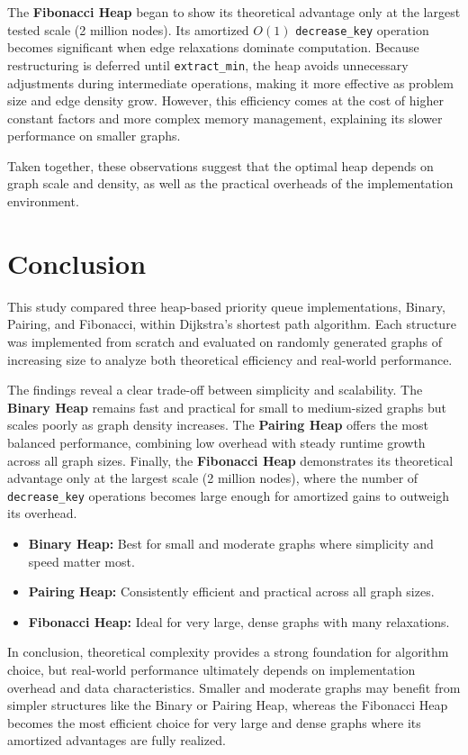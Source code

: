 \documentclass[acmsmall]{acmart}
\begin{document}
The \textbf{Fibonacci Heap} began to show its theoretical advantage only at the largest tested scale (2 million nodes).  
Its amortized $O(1)$ \texttt{decrease\_key} operation becomes significant when edge relaxations dominate computation.  
Because restructuring is deferred until \texttt{extract\_min}, the heap avoids unnecessary adjustments during intermediate operations, making it more effective as problem size and edge density grow. However, this efficiency comes at the cost of higher constant factors and more complex memory management, explaining its slower performance on smaller graphs.

Taken together, these observations suggest that the optimal heap depends on graph scale and density, as well as the practical overheads of the implementation environment.

\section{Conclusion}
This study compared three heap-based priority queue implementations, Binary, Pairing, and Fibonacci, within Dijkstra’s shortest path algorithm. Each structure was implemented from scratch and evaluated on randomly generated graphs of increasing size to analyze both theoretical efficiency and real-world performance.

The findings reveal a clear trade-off between simplicity and scalability. The \textbf{Binary Heap} remains fast and practical for small to medium-sized graphs but scales poorly as graph density increases. The \textbf{Pairing Heap} offers the most balanced performance, combining low overhead with steady runtime growth across all graph sizes. Finally, the \textbf{Fibonacci Heap} demonstrates its theoretical advantage only at the largest scale (2 million nodes), where the number of \texttt{decrease\_key} operations becomes large enough for amortized gains to outweigh its overhead.

\begin{itemize}
  \item \textbf{Binary Heap:} Best for small and moderate graphs where simplicity and speed matter most.  
  \item \textbf{Pairing Heap:} Consistently efficient and practical across all graph sizes.  
  \item \textbf{Fibonacci Heap:} Ideal for very large, dense graphs with many relaxations.
\end{itemize}

In conclusion, theoretical complexity provides a strong foundation for algorithm choice, but real-world performance ultimately depends on implementation overhead and data characteristics. Smaller and moderate graphs may benefit from simpler structures like the Binary or Pairing Heap, whereas the Fibonacci Heap becomes the most efficient choice for very large and dense graphs where its amortized advantages are fully realized.
\end{document}
